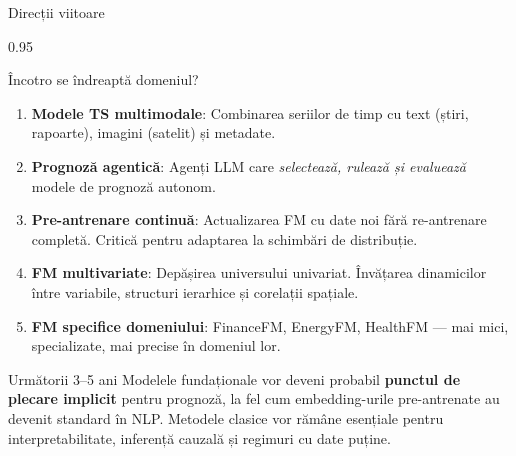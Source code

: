 \documentclass[9pt, aspectratio=169, t]{beamer}
\begin{document}
\begin{frame}{Direcții viitoare}
    \begin{cminipage}{0.95\textwidth}
    \vspace{-3mm}
    \begin{block}{Încotro se îndreaptă domeniul?}
        {\scriptsize
        \begin{enumerate}\setlength{\itemsep}{1pt}
            \item \textbf{Modele TS multimodale}: Combinarea seriilor de timp cu text (știri, rapoarte), imagini (satelit) și metadate.
            \item \textbf{Prognoză agentică}: Agenți LLM care \textit{selectează, rulează și evaluează} modele de prognoză autonom.
            \item \textbf{Pre-antrenare continuă}: Actualizarea FM cu date noi fără re-antrenare completă. Critică pentru adaptarea la schimbări de distribuție.
            \item \textbf{FM multivariate}: Depășirea universului univariat. Învățarea dinamicilor între variabile, structuri ierarhice și corelații spațiale.
            \item \textbf{FM specifice domeniului}: FinanceFM, EnergyFM, HealthFM --- mai mici, specializate, mai precise în domeniul lor.
        \end{enumerate}
        }
    \end{block}
    \vspace{-2mm}
    \begin{exampleblock}{Următorii 3--5 ani}
        {\scriptsize Modelele fundaționale vor deveni probabil \textbf{punctul de plecare implicit} pentru prognoză, la fel cum embedding-urile pre-antrenate au devenit standard în NLP. Metodele clasice vor rămâne esențiale pentru interpretabilitate, inferență cauzală și regimuri cu date puține.}
    \end{exampleblock}
    \end{cminipage}
\end{frame}
\end{document}
